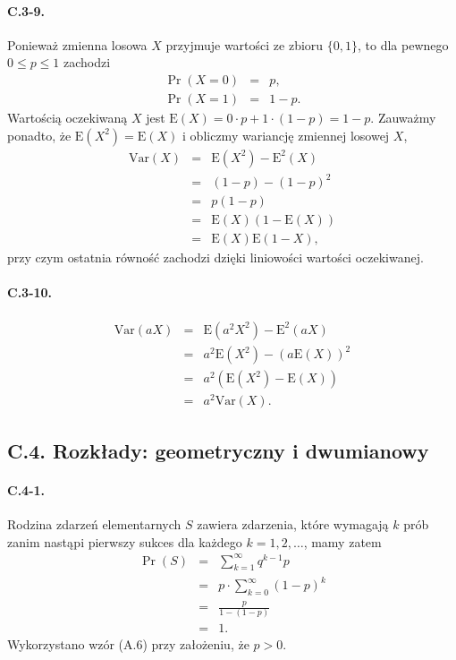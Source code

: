 \paragraph{C.3-9.}
Ponieważ zmienna losowa $X$ przyjmuje wartości ze zbioru $\{ 0,1\}$, to dla pewnego $0\le p\le 1$ zachodzi
\begin{eqnarray*}
	\Pr(X=0) &=& p, \\
	\Pr(X=1) &=& 1-p.
\end{eqnarray*}
Wartością oczekiwaną $X$ jest $\mathrm{E}(X)=0\cdot p+1\cdot (1-p)=1-p$. Zauważmy ponadto, że $\mathrm{E}\left(X^2\right)=\mathrm{E}(X)$ i obliczmy wariancję zmiennej losowej $X$,
\begin{eqnarray*}
	\mathrm{Var}(X) &=& \mathrm{E}\left(X^2\right)-\mathrm{E}^2(X) \\
	&=& (1-p)-(1-p)^2 \\
	&=& p(1-p) \\
	&=& \mathrm{E}(X)(1-\mathrm{E}(X)) \\
	&=& \mathrm{E}(X)\mathrm{E}(1-X),
\end{eqnarray*}
przy czym ostatnia równość zachodzi dzięki liniowości wartości oczekiwanej.

\paragraph{C.3-10.}
\begin{eqnarray*}
	\mathrm{Var}(aX) &=& \mathrm{E}\left(a^2X^2\right)-\mathrm{E}^2(aX) \\
	&=& a^2\mathrm{E}\left(X^2\right)-(a\mathrm{E}(X))^2 \\
	&=& a^2\left(\mathrm{E}\left(X^2\right)-\mathrm{E}(X)\right) \\
	&=& a^2\mathrm{Var}(X).
\end{eqnarray*}

\subsection*{C.4. Rozkłady: geometryczny i dwumianowy}
\paragraph{C.4-1.}
Rodzina zdarzeń elementarnych $S$ zawiera zdarzenia, które wymagają $k$ prób zanim nastąpi pierwszy sukces dla każdego $k=1,2,\dots$, mamy zatem
\begin{eqnarray*}
	\Pr(S) &=& \sum_{k=1}^\infty q^{k-1}p \\
	&=& p\cdot\sum_{k=0}^\infty (1-p)^k \\
	&=& \frac{p}{1-(1-p)} \\
	&=& 1.
\end{eqnarray*}
Wykorzystano wzór (A.6) przy założeniu, że $p>0$.

